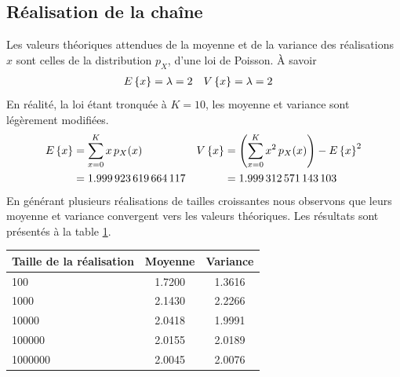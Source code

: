 \documentclass[a4paper, 12pt]{report}
\begin{document}
	\subsection{Réalisation de la chaîne}
	\label{sec:etude_realisation}
	Les valeurs théoriques attendues de la moyenne et de la variance des réalisations $x$ sont celles de la distribution $p_X$, \cad{} d'une loi de Poisson. À savoir
	\begin{align*}
	    E\left\{x\right\} & = \lambda = 2 & V\left\{x\right\} & = \lambda = 2
	\end{align*}
    En réalité, la loi étant tronquée à $K = 10$, les moyenne et variance sont légèrement modifiées.
    \begin{align*}
	    E\left\{x\right\} & = \sum_{x = 0}^{K} x \, p_X(x) & V\left\{x\right\} & = \left(\sum_{x = 0}^{K} x^2 \, p_X(x)\right) - E\left\{x\right\}^2 \\
	    & = \num{1.999923619664117} & & = \num{1.999312571143103}
	\end{align*}
	En générant plusieurs réalisations de tailles croissantes nous observons que leurs moyenne et variance convergent vers les valeurs théoriques. Les résultats sont présentés à la table \ref{tab:moyenne_variance}.\par
	\begin{table}[H]
	    \centering
	    \begin{tabular}{|l|c|c|}
	        \hline
	        {\bf Taille de la réalisation} & {\bf Moyenne} & {\bf Variance} \\ \hline
	        \hline
	        \num{100} & \num{1.7200} & \num{1.3616} \\ \hline
	        \num{1000} & \num{2.1430} & \num{2.2266} \\ \hline
	        \num{10000} & \num{2.0418} & \num{1.9991} \\ \hline
	        \num{100000} & \num{2.0155} & \num{2.0189} \\ \hline
	        \num{1000000} & \num{2.0045} & \num{2.0076} \\ \hline
	    \end{tabular}
	    \label{tab:moyenne_variance}
	\end{table}
\end{document}
